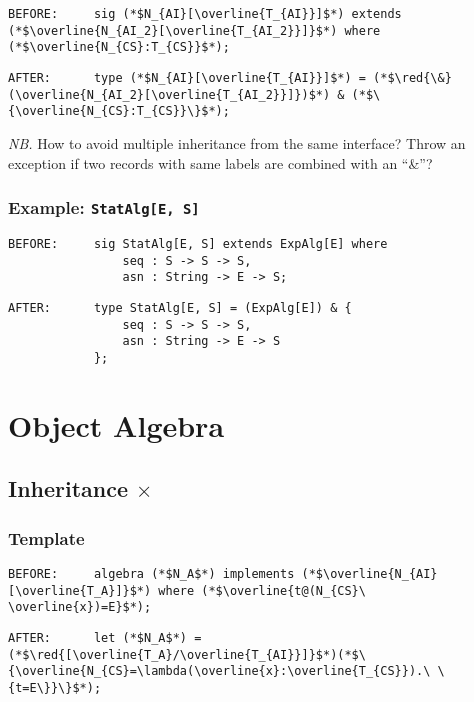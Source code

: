 \documentclass{article}
\newcommand{\red}[1]{\textcolor{red}{#1}}
\newcommand{\nb}{\textit{NB. }}
\begin{document}
\begin{spacing}{1.1}
\begin{lstlisting}[numbers=none]
BEFORE:     sig (*$N_{AI}[\overline{T_{AI}}]$*) extends (*$\overline{N_{AI_2}[\overline{T_{AI_2}}]}$*) where (*$\overline{N_{CS}:T_{CS}}$*);
\end{lstlisting}
\begin{lstlisting}[numbers=none]
AFTER:      type (*$N_{AI}[\overline{T_{AI}}]$*) = (*$\red{\&}(\overline{N_{AI_2}[\overline{T_{AI_2}}]})$*) & (*$\{\overline{N_{CS}:T_{CS}}\}$*);
\end{lstlisting}

\nb How to avoid multiple inheritance from the same interface? Throw an exception if two records with same labels are combined with an ``\&''?

\subsubsection{Example: \lstinline{StatAlg[E, S]}}

\begin{lstlisting}[numbers=none]
BEFORE:     sig StatAlg[E, S] extends ExpAlg[E] where
                seq : S -> S -> S,
                asn : String -> E -> S;
\end{lstlisting}
\begin{lstlisting}[numbers=none]
AFTER:      type StatAlg[E, S] = (ExpAlg[E]) & {
                seq : S -> S -> S,
                asn : String -> E -> S
            };
\end{lstlisting}

\section{Object Algebra}

\subsection{Inheritance $\times$}

\subsubsection{Template}

\begin{lstlisting}[numbers=none]
BEFORE:     algebra (*$N_A$*) implements (*$\overline{N_{AI}[\overline{T_A}]}$*) where (*$\overline{t@(N_{CS}\ \overline{x})=E}$*);
\end{lstlisting}
\begin{lstlisting}[numbers=none]
AFTER:      let (*$N_A$*) = (*$\red{[\overline{T_A}/\overline{T_{AI}}]}$*)(*$\{\overline{N_{CS}=\lambda(\overline{x}:\overline{T_{CS}}).\ \{t=E\}}\}$*);
\end{lstlisting}


\end{spacing}
\end{document}
